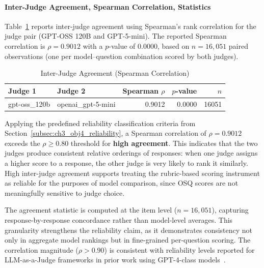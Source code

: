 \paragraph{Inter-Judge Agreement, Spearman Correlation, Statistics}

Table~\ref{tab:interjudge_corr_mirror} reports inter-judge agreement using Spearman's rank correlation for the judge pair (GPT-OSS 120B and GPT-5-mini). The reported Spearman correlation is $\rho = 0.9012$ with a $p$-value of 0.0000, based on $n = 16{,}051$ paired observations (one per model--question combination scored by both judges).

\begin{table}[htbp]
\centering
\caption{Inter-Judge Agreement (Spearman Correlation)}
\label{tab:interjudge_corr_mirror}
\begin{tabular}{llrrr}
\toprule
Judge 1 & Judge 2 & Spearman $\rho$ & $p$-value & $n$ \\
\midrule
gpt-oss\_120b & openai\_gpt-5-mini & 0.9012 & 0.0000 & 16051 \\
\bottomrule
\end{tabular}
\end{table}

Applying the predefined reliability classification criteria from Section~\ref{subsec:ch3_obj4_reliability}, a Spearman correlation of $\rho = 0.9012$ exceeds the $\rho \geq 0.80$ threshold for \textbf{high agreement}. This indicates that the two judges produce consistent relative orderings of responses: when one judge assigns a higher score to a response, the other judge is very likely to rank it similarly. High inter-judge agreement supports treating the rubric-based scoring instrument as reliable for the purposes of model comparison, since OSQ scores are not meaningfully sensitive to judge choice.

The agreement statistic is computed at the item level ($n = 16{,}051$), capturing response-by-response concordance rather than model-level averages. This granularity strengthens the reliability claim, as it demonstrates consistency not only in aggregate model rankings but in fine-grained per-question scoring. The correlation magnitude ($\rho > 0.90$) is consistent with reliability levels reported for LLM-as-a-Judge frameworks in prior work using GPT-4-class models~\cite{zheng_JudgingLLMasaJudgeMTBench_2023}.



